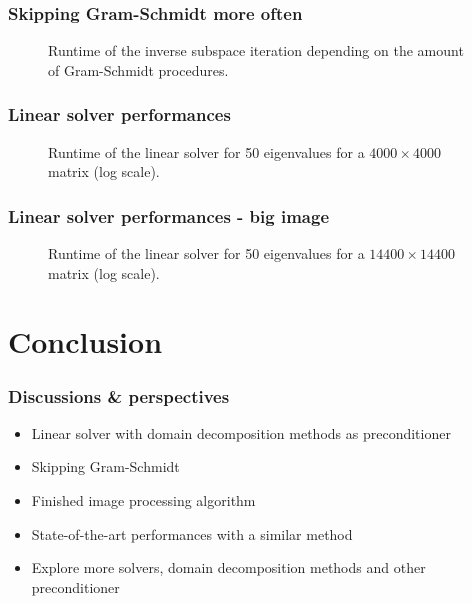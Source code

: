 \documentclass{beamer}
\begin{document}
\begin{frame}
 \frametitle{Skipping Gram-Schmidt more often}
 \begin{figure}[H]
  \centering
  \scalebox{0.8}{}
  \caption{Runtime of the inverse subspace iteration depending on the amount of Gram-Schmidt procedures.}
  \end{figure}
\end{frame}

\begin{frame}
 \frametitle{Linear solver performances}
 \begin{figure}[H]
  \centering
  \scalebox{0.95}{}
  \caption{Runtime of the linear solver for 50 eigenvalues for a \(4000 \times 4000\) matrix (log scale).}
 \end{figure}
\end{frame}

\begin{frame}
 \frametitle{Linear solver performances - big image}
 \begin{figure}[H]
  \centering
  \scalebox{0.95}{}
  \caption{Runtime of the linear solver for 50 eigenvalues for a \(14400 \times 14400\) matrix (log scale).}
 \end{figure}
\end{frame}

\section[Section]{Conclusion}

\begin{frame}
 \frametitle{Discussions \& perspectives}
 \begin{itemize}
  \item Linear solver with domain decomposition methods as preconditioner
  \item Skipping Gram-Schmidt
 \end{itemize}
 \begin{itemize}
  \item Finished image processing algorithm
  \item State-of-the-art performances with a similar method
  \item Explore more solvers, domain decomposition methods and other preconditioner
 \end{itemize}
\end{frame}
\end{document}
